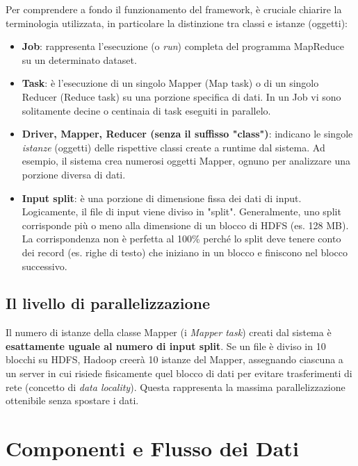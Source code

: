 Per comprendere a fondo il funzionamento del framework, è cruciale chiarire la terminologia utilizzata, in particolare la distinzione tra classi e istanze (oggetti):
\begin{itemize}
    \item \textbf{Job}: rappresenta l'esecuzione (o \textit{run}) completa del programma MapReduce su un determinato dataset.
    \item \textbf{Task}: è l'esecuzione di un singolo Mapper (Map task) o di un singolo Reducer (Reduce task) su una porzione specifica di dati. In un Job vi sono solitamente decine o centinaia di task eseguiti in parallelo.
    \item \textbf{Driver, Mapper, Reducer (senza il suffisso "class")}: indicano le singole \textit{istanze} (oggetti) delle rispettive classi create a runtime dal sistema. Ad esempio, il sistema crea numerosi oggetti Mapper, ognuno per analizzare una porzione diversa di dati.
    \item \textbf{Input split}: è una porzione di dimensione fissa dei dati di input. Logicamente, il file di input viene diviso in "split". Generalmente, uno split corrisponde più o meno alla dimensione di un blocco di HDFS (es. 128 MB). La corrispondenza non è perfetta al 100\% perché lo split deve tenere conto dei record (es. righe di testo) che iniziano in un blocco e finiscono nel blocco successivo. 
\end{itemize}

\subsection{Il livello di parallelizzazione}
Il numero di istanze della classe Mapper (i \textit{Mapper task}) creati dal sistema è \textbf{esattamente uguale al numero di input split}. 
Se un file è diviso in 10 blocchi su HDFS, Hadoop creerà 10 istanze del Mapper, assegnando ciascuna a un server in cui risiede fisicamente quel blocco di dati per evitare trasferimenti di rete (concetto di \textit{data locality}). Questa rappresenta la massima parallelizzazione ottenibile senza spostare i dati.

\section{Componenti e Flusso dei Dati}

